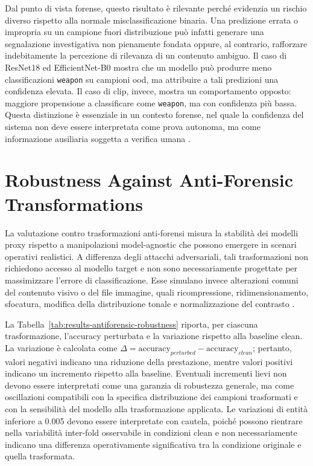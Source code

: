 Dal punto di vista forense, questo risultato è rilevante perché evidenzia un
rischio diverso rispetto alla normale misclassificazione binaria. Una predizione
errata o impropria su un campione fuori distribuzione può infatti generare una
segnalazione investigativa non pienamente fondata oppure, al contrario,
rafforzare indebitamente la percezione di rilevanza di un contenuto ambiguo. Il
caso di ResNet18 ed EfficientNet-B0 mostra che un modello può produrre meno
classificazioni \texttt{weapon} su campioni \gls{ood}, ma attribuire a tali
predizioni una confidenza elevata. Il caso di \gls{clip}, invece, mostra un
comportamento opposto: maggiore propensione a classificare come \texttt{weapon},
ma con confidenza più bassa. Questa distinzione è essenziale in un contesto
forense, nel quale la confidenza del sistema non deve essere interpretata come
prova autonoma, ma come informazione ausiliaria soggetta a verifica umana
\cite{guo2017calibration,nist2023airmf}.

\section{Robustness Against Anti-Forensic Transformations}
\label{sec:results-antiforensic}

La valutazione contro trasformazioni anti-forensi misura la stabilità dei modelli
proxy rispetto a manipolazioni model-agnostic che possono emergere in scenari
operativi realistici. A differenza degli attacchi adversariali, tali
trasformazioni non richiedono accesso al modello target e non sono
necessariamente progettate per massimizzare l'errore di classificazione. Esse
simulano invece alterazioni comuni del contenuto visivo o del file immagine,
quali ricompressione, ridimensionamento, sfocatura, modifica della distribuzione
tonale e normalizzazione del contrasto
\cite{stamm2010anti,yaacoub2021digital,hendrycks2019benchmarking}.

La Tabella~\ref{tab:results-antiforensic-robustness} riporta, per ciascuna
trasformazione, l'accuracy perturbata e la variazione rispetto alla baseline
clean. La variazione è calcolata come
\(\Delta=\text{accuracy}_{perturbed}-\text{accuracy}_{clean}\); pertanto, valori
negativi indicano una riduzione della prestazione, mentre valori positivi
indicano un incremento rispetto alla baseline. Eventuali incrementi lievi non
devono essere interpretati come una garanzia di robustezza generale, ma come
oscillazioni compatibili con la specifica distribuzione dei campioni trasformati
e con la sensibilità del modello alla trasformazione applicata. Le variazioni di
entità inferiore a 0.005 devono essere interpretate con cautela, poiché possono
rientrare nella variabilità inter-fold osservabile in condizioni clean e non
necessariamente indicano una differenza operativamente significativa tra la
condizione originale e quella trasformata.

